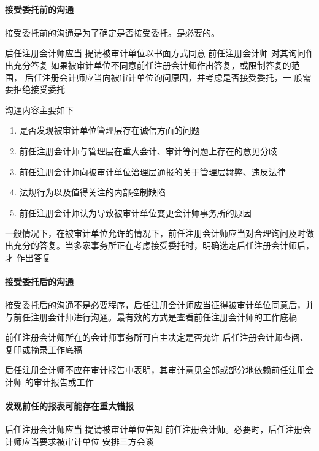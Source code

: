 \documentclass[UTF8,12pt]{ctexart}
\numberwithin{equation}{section} %
\numberwithin{figure}{section}
\numberwithin{table}{section}
\begin{document}
	\paragraph{接受委托前的沟通}
	接受委托前的沟通是为了确定是否接受委托。是必要的。
	
	后任注册会计师应当  提请被审计单位以书面方式同意  前任注册会计师 对其询问作出充分答复  如果被审计单位不同意前任注册会计师作出答复，或限制答复的范围， 后任注册会计师应当向被审计单位询问原因，并考虑是否接受委托，一 般需要拒绝接受委托
	
	沟通内容主要如下
	\begin{enumerate}
		\item 是否发现被审计单位管理层存在诚信方面的问题
		
		\item 前任注册会计师与管理层在重大会计、审计等问题上存在的意见分歧
		
		\item 前任注册会计师向被审计单位治理层通报的关于管理层舞弊、违反法律
		
		\item 法规行为以及值得关注的内部控制缺陷
		
		\item 前任注册会计师认为导致被审计单位变更会计师事务所的原因
	\end{enumerate}
	
	 一般情况下，在被审计单位允许的情况下，前任注册会计师应当对合理询问及时做出充分的答复。当多家事务所正在考虑接受委托时，明确选定后任注册会计师后，才 作出答复
	
	\paragraph{接受委托后的沟通}
	接受委托后的沟通不是必要程序，后任注册会计师应当征得被审计单位同意后，并与前任注册会计师进行沟通。最有效的方式是查看前任注册会计师的工作底稿
	
	前任注册会计师所在的会计师事务所可自主决定是否允许  后任注册会计师查阅、复印或摘录工作底稿
	
	后任注册会计师不应在审计报告中表明，其审计意见全部或部分地依赖前任注册会计师  的审计报告或工作
	
	\paragraph{发现前任的报表可能存在重大错报}
	后任注册会计师应当  提请被审计单位告知  前任注册会计师。必要时，后任注册会计师应当要求被审计单位  安排三方会谈
	
\end{document}
